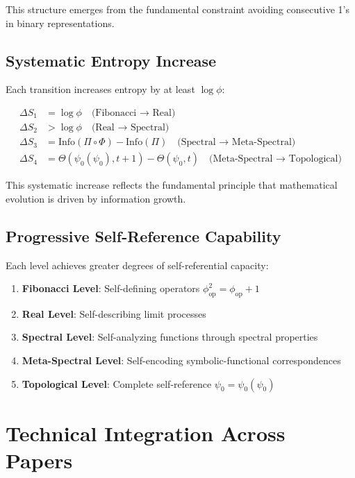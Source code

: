 \documentclass[12pt]{article}
\theoremstyle{plain}
\theoremstyle{definition}
\begin{document}
This structure emerges from the fundamental constraint avoiding consecutive 1's in binary representations.

\subsection{Systematic Entropy Increase}

Each transition increases entropy by at least $\log \phi$:

\begin{align}
\Delta S_1 &= \log \phi \quad \text{(Fibonacci → Real)}\\
\Delta S_2 &> \log \phi \quad \text{(Real → Spectral)}\\
\Delta S_3 &= \text{Info}(\Pi \circ \Phi) - \text{Info}(\Pi) \quad \text{(Spectral → Meta-Spectral)}\\
\Delta S_4 &= \Theta(\psi_0(\psi_0), t+1) - \Theta(\psi_0, t) \quad \text{(Meta-Spectral → Topological)}
\end{align}

This systematic increase reflects the fundamental principle that mathematical evolution is driven by information growth.

\subsection{Progressive Self-Reference Capability}

Each level achieves greater degrees of self-referential capacity:

\begin{enumerate}
\item \textbf{Fibonacci Level}: Self-defining operators $\phi_{\text{op}}^2 = \phi_{\text{op}} + 1$
\item \textbf{Real Level}: Self-describing limit processes
\item \textbf{Spectral Level}: Self-analyzing functions through spectral properties  
\item \textbf{Meta-Spectral Level}: Self-encoding symbolic-functional correspondences
\item \textbf{Topological Level}: Complete self-reference $\psi_0 = \psi_0(\psi_0)$
\end{enumerate}

\section{Technical Integration Across Papers}
\end{document}
